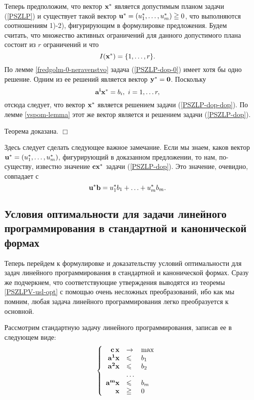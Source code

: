 Теперь предположим, что вектор $\mathbf{x}^{*}$  является допустимым
планом задачи (\ref{PSZLP}) и существует такой вектор
    $\mathbf{u}^{*}=(u_{1}^{*},\ldots,u_{m}^{*})\geqq0$, что выполняются
соотношениям 1)-2), фигурирующим в формулировке предложения. Будем
считать, что множество активных ограничений для данного допустимого
плана состоит из $r$ ограничений и что
    \[I(\mathbf{x^{*}})=\{1,\ldots,r\}.\]
По лемме \ref{fredgolm-0-neravenstvo} задача (\ref{PSZLP-dop-0})
имеет хотя бы одно решение. Одним из ее решений является вектор
$\mathbf{y^{*}}=\mathbf{0}$. Поскольку
\[\mathbf{a^{i}}\mathbf{x^{*}}=b_{i},\ i=1,\ldots r,\]
отсюда следует, что вектор $\mathbf{x^{*}}$ является решением задачи
(\ref{PSZLP-dop-dop}). По лемме \ref{vspom-lemma} этот же вектор
является и решением задачи (\ref{PSZLP-dop}).

    Теорема доказана.
$\Box$


Здесь следует сделать следующее важное замечание. Если мы знаем,
каков вектор $\mathbf{u}^{*}=(u_{1}^{*},\ldots,u_{m}^{*})$, фигурирующий
в доказанном предложении, то нам, по-существу, известно значение
$\mathbf{c}\mathbf{x^{*}}$ задачи (\ref{PSZLP-dop}). Это значение, очевидно,
совпадает с
\[\mathbf{u}^{*}\mathbf{b}=u_{1}^{*}b_{1}+\ldots+u_{m}^{*}b_{m}.\]


\subsection{Условия оптимальности для задачи линейного
программирования в стандартной и канонической формах}

Теперь перейдем к формулировке и доказательству условий
оптимальности для задач линейного программирования в стандартной и
канонической формах. Сразу же подчеркнем, что соответствующие
утверждения выводятся из теоремы \ref{PSZLPV-usl-opt} с помощью
очень несложных преобразований, ибо как мы помним, любая задача
линейного программирования легко преобразуется к основной.

    Рассмотрим стандартную задачу линейного программирования, записав ее в следующем виде:
\begin{equation} \label{SZLP-qq}
\left\{
\begin{array}{rll}
     \mathbf{c} \, \mathbf{x} &\to & \max\\
     \mathbf{a^{1}}\mathbf{x} &\leqslant& b_1 \\
     \mathbf{a^{2}}\mathbf{x} &\leqslant& b_2\\
                      & \ldots &\\
     \mathbf{a^{m}}\mathbf{x} &\leqslant& b_m\\
     \mathbf{x}&\geqq&0  \\
\end{array} \right.
\end{equation}

